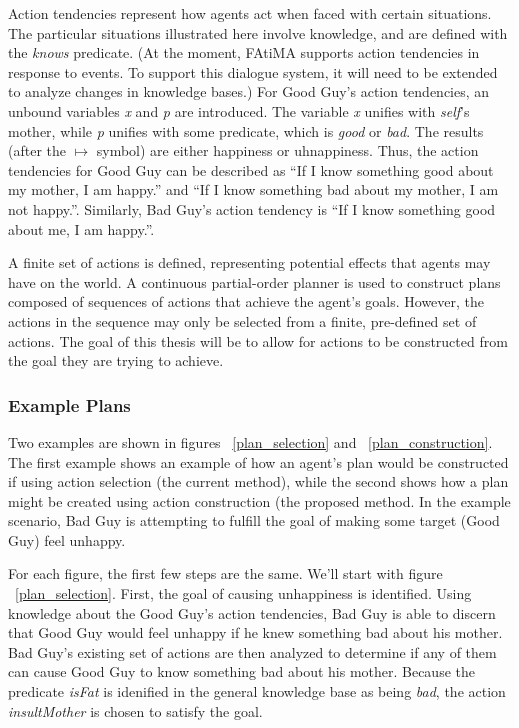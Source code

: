 \documentclass{article}
\begin{document}
Action tendencies represent how agents act when faced with certain
situations.  The particular situations illustrated here involve
knowledge, and are defined with the \emph{knows} predicate.  (At the
moment, FAtiMA supports action tendencies in response to events.  To
support this dialogue system, it will need to be extended to analyze
changes in knowledge bases.)  For Good Guy's action tendencies, an
unbound variables \emph{x} and \emph{p} are introduced.
The variable \emph{x} unifies with \emph{self}'s mother, while \emph{p}
unifies with some predicate, which is \emph{good} or \emph{bad}.
The results (after the $\mapsto$ symbol) are either happiness or uhnappiness.  Thus, the
action tendencies for Good Guy can be described as ``If I know something
good about my mother, I am happy.'' and ``If I know something bad about my mother, I
am not happy.''.  Similarly, Bad Guy's action tendency is ``If I know
something good about me, I am happy.''.

A finite set of actions is defined, representing potential effects
that agents may have on the world.  A continuous partial-order planner
\cite{Paiva2005, Russell2003} is used to construct plans composed of
sequences of actions that achieve the agent's goals.  However, the
actions in the sequence may only be selected from a finite,
pre-defined set of actions.  The goal of this thesis will be to allow
for actions to be constructed from the goal they are trying to achieve.

\subsubsection{Example Plans}

Two examples are shown in figures ~\ref{plan_selection} and ~\ref{plan_construction}.
The first example shows an example of how an agent's plan would be
constructed if using action selection (the current method), while the
second shows how a plan might be created using action construction
(the proposed method.  In the example scenario, Bad Guy is attempting
to fulfill the goal of making some target (Good Guy) feel unhappy.

For each figure, the first few steps are the same.  We'll start with
figure ~\ref{plan_selection}.  First, the goal of causing
unhappiness is identified.  Using knowledge about the Good Guy's
action tendencies, Bad Guy is able to discern that Good Guy would
feel unhappy if he knew something bad about his mother.  Bad Guy's existing
set of actions are then analyzed to determine if any of them can
cause Good Guy to know something bad about his mother.  Because the
predicate \emph{isFat} is idenified in the general knowledge base as
being \emph{bad}, the action \emph{insultMother} is chosen to satisfy the
goal.
\end{document}
